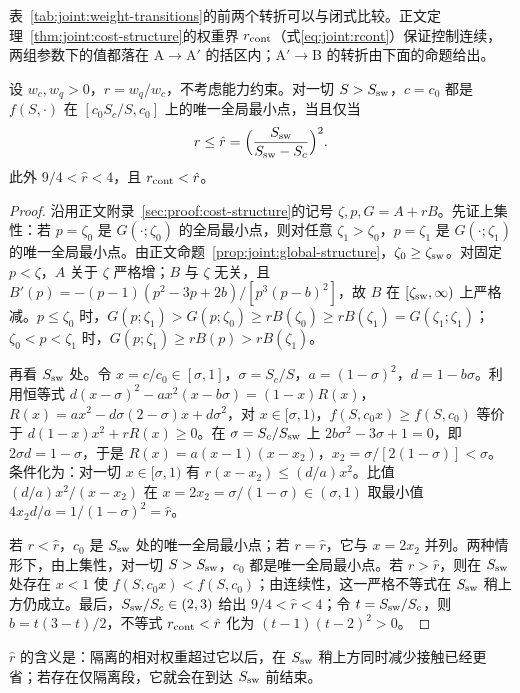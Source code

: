表~\ref{tab:joint:weight-transitions}的前两个转折可以与闭式比较。正文定理~\ref{thm:joint:cost-structure}的权重界 $r_{\rm cont}$（式\eqref{eq:joint:rcont}）保证控制连续，两组参数下的值都落在 A$\to$A$'$ 的括区内；A$'\to$B 的转折由下面的命题给出。
\begin{proposition}
\label{prop:sup:rhat}
设 $w_c,w_q>0$，$r=w_q/w_c$，不考虑能力约束。对一切 $S>S_{\rm sw}$，$c=c_0$ 都是 $f(S,\cdot)$ 在 $[c_0S_c/S,c_0]$ 上的唯一全局最小点，当且仅当
\[
r\le\hat r=\Bigl(\frac{S_{\rm sw}}{S_{\rm sw}-S_c}\Bigr)^2 .
\]
此外 $9/4<\hat r<4$，且 $r_{\rm cont}<\hat r$。
\end{proposition}
\begin{proof}
沿用正文附录~\ref{sec:proof:cost-structure}的记号 $\zeta,p,G=A+rB$。先证上集性：若 $p=\zeta_0$ 是 $G(\cdot;\zeta_0)$ 的全局最小点，则对任意 $\zeta_1>\zeta_0$，$p=\zeta_1$ 是 $G(\cdot;\zeta_1)$ 的唯一全局最小点。由正文命题~\ref{prop:joint:global-structure}，$\zeta_0\ge\zeta_{\rm sw}$。对固定 $p<\zeta$，$A$ 关于 $\zeta$ 严格增；$B$ 与 $\zeta$ 无关，且 $B'(p)=-(p-1)(p^2-3p+2b)/[p^3(p-b)^2]$，故 $B$ 在 $[\zeta_{\rm sw},\infty)$ 上严格减。$p\le\zeta_0$ 时，$G(p;\zeta_1)>G(p;\zeta_0)\ge rB(\zeta_0)\ge rB(\zeta_1)=G(\zeta_1;\zeta_1)$；$\zeta_0<p<\zeta_1$ 时，$G(p;\zeta_1)\ge rB(p)>rB(\zeta_1)$。

再看 $S_{\rm sw}$ 处。令 $x=c/c_0\in[\sigma,1]$，$\sigma=S_c/S$，$a=(1-\sigma)^2$，$d=1-b\sigma$。利用恒等式 $d(x-\sigma)^2-ax^2(x-b\sigma)=(1-x)R(x)$，$R(x)=ax^2-d\sigma(2-\sigma)x+d\sigma^2$，对 $x\in[\sigma,1)$，$f(S,c_0x)\ge f(S,c_0)$ 等价于 $d(1-x)x^2+rR(x)\ge0$。在 $\sigma=S_c/S_{\rm sw}$ 上 $2b\sigma^2-3\sigma+1=0$，即 $2\sigma d=1-\sigma$，于是 $R(x)=a(x-1)(x-x_2)$，$x_2=\sigma/[2(1-\sigma)]<\sigma$。条件化为：对一切 $x\in[\sigma,1)$ 有 $r(x-x_2)\le(d/a)x^2$。比值 $(d/a)x^2/(x-x_2)$ 在 $x=2x_2=\sigma/(1-\sigma)\in(\sigma,1)$ 取最小值 $4x_2d/a=1/(1-\sigma)^2=\hat r$。

若 $r<\hat r$，$c_0$ 是 $S_{\rm sw}$ 处的唯一全局最小点；若 $r=\hat r$，它与 $x=2x_2$ 并列。两种情形下，由上集性，对一切 $S>S_{\rm sw}$，$c_0$ 都是唯一全局最小点。若 $r>\hat r$，则在 $S_{\rm sw}$ 处存在 $x<1$ 使 $f(S,c_0x)<f(S,c_0)$；由连续性，这一严格不等式在 $S_{\rm sw}$ 稍上方仍成立。最后，$S_{\rm sw}/S_c\in(2,3)$ 给出 $9/4<\hat r<4$；令 $t=S_{\rm sw}/S_c$，则 $b=t(3-t)/2$，不等式 $r_{\rm cont}<\hat r$ 化为 $(t-1)(t-2)^2>0$。
\end{proof}
$\hat r$ 的含义是：隔离的相对权重超过它以后，在 $S_{\rm sw}$ 稍上方同时减少接触已经更省；若存在仅隔离段，它就会在到达 $S_{\rm sw}$ 前结束。
